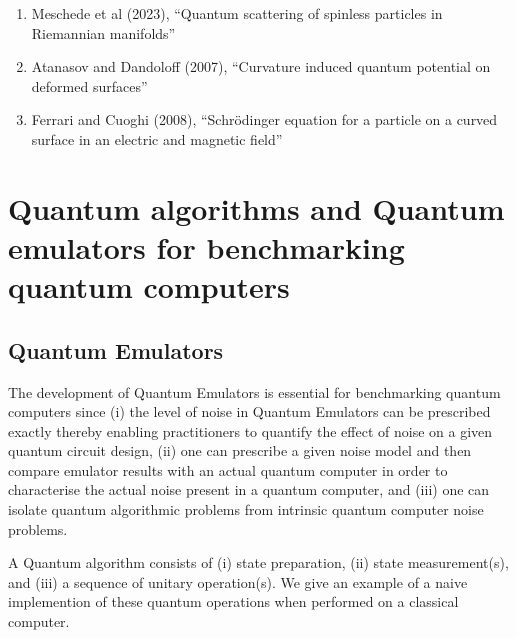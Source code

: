 \documentclass[]{article}
\begin{document}
\begin{enumerate}
\item Meschede et al (2023)\cite{PhysRevA.107.062806}, ``Quantum scattering of spinless particles in Riemannian manifolds''
\item Atanasov and Dandoloff (2007)\cite{atanasov2007curvature}, ``Curvature induced quantum potential on deformed surfaces''
\item Ferrari and Cuoghi (2008)\cite{ferrari2008schrodinger}, ``Schr{\"o}dinger equation for a particle on a curved surface in an electric and magnetic field''
\end{enumerate}



\section{Quantum algorithms and Quantum emulators
  for benchmarking quantum computers}

\par\noindent
\subsection{Quantum Emulators}
The development of Quantum Emulators is essential for benchmarking quantum 
computers since (i) the level of noise in Quantum Emulators can be prescribed exactly thereby enabling practitioners to quantify the effect of 
noise on a given quantum circuit design, (ii)
one can prescribe a given noise model\cite{PhysRevA.107.062406} and then
compare emulator results with an actual quantum computer in order to 
characterise the actual noise present in a quantum computer, and
(iii) one can isolate quantum algorithmic problems from intrinsic
quantum computer noise problems.

A Quantum algorithm consists of (i) state preparation, 
(ii) state measurement(s), and (iii) a sequence of unitary operation(s).
We give an example of a naive implemention of these quantum operations
when performed on a classical computer.
\end{document}
